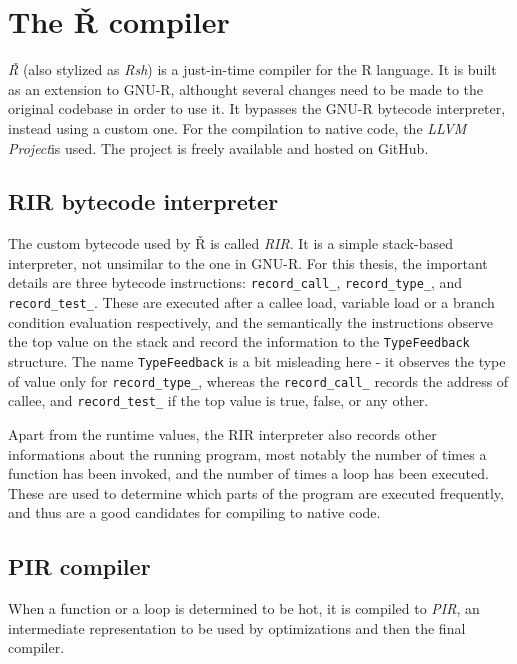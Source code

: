 \section{The Ř compiler}

\textit{Ř} (also stylized as \textit{Rsh}) is a just-in-time compiler for the R language. It is built as an extension to GNU-R, althought several changes need to be made to the original codebase in order to use it. It bypasses the GNU-R bytecode interpreter, instead using a custom one. For the compilation to native code, the \textit{LLVM Project}\todocite is used. The project is freely available and hosted on GitHub.


\subsection{RIR bytecode interpreter}

The custom bytecode used by Ř is called \textit{RIR}. It is a simple stack-based interpreter, not unsimilar to the one in GNU-R. For this thesis, the important details are three bytecode instructions: \texttt{record\_call\_}, \texttt{record\_type\_}, and \texttt{record\_test\_}. These are executed after a callee load, variable load or a branch condition evaluation respectively, and the semantically the instructions observe the top value on the stack and record the information to the  \texttt{TypeFeedback} structure. The name \texttt{TypeFeedback} is a bit misleading here - it observes the type of value only for \texttt{record\_type\_}, whereas the \texttt{record\_call\_} records the address of callee, and \texttt{record\_test\_} if the top value is true, false, or any other.

Apart from the runtime values, the RIR interpreter also records other informations about the running program, most notably the number of times a function has been invoked, and the number of times a loop has been executed. These are used to determine which parts of the program are executed frequently, and thus are a good candidates for compiling to native code.

\subsection{PIR compiler}
When a function or a loop is determined to be hot, it is compiled to \textit{PIR}, an intermediate representation to be used by optimizations and then the final compiler.

